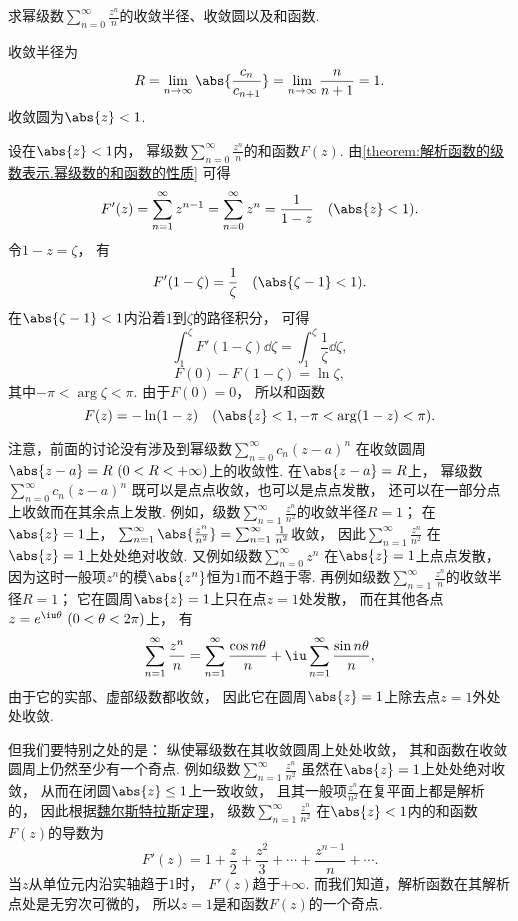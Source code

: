 \begin{example}
求幂级数\(\sum_{n=0}^\infty \frac{z^n}{n}\)的收敛半径、收敛圆以及和函数.
\begin{solution}
收敛半径为\[
	R = \lim_{n\to\infty} \abs{\frac{c_n}{c_{n+1}}}
	= \lim_{n\to\infty} \frac{n}{n+1}
	= 1.
\]
收敛圆为\(\abs{z} < 1\).

设在\(\abs{z} < 1\)内，
幂级数\(\sum_{n=0}^\infty \frac{z^n}{n}\)的和函数\(F(z)\).
由\cref{theorem:解析函数的级数表示.幂级数的和函数的性质} 可得\[
	F'(z) = \sum_{n=1}^\infty z^{n-1}
	= \sum_{n=0}^\infty z^n
	= \frac{1}{1-z}
	\quad(\abs{z} < 1).
\]
令\(1-z = \zeta\)，
有\[
	F'(1-\zeta) = \frac{1}{\zeta}
	\quad(\abs{\zeta-1}<1).
\]
在\(\abs{\zeta-1}<1\)内沿着\(1\)到\(\zeta\)的路径积分，
可得\[
	\int_1^{\zeta} F'(1-\zeta) \dd{\zeta}
	= \int_1^{\zeta} \frac{1}{\zeta} \dd{\zeta},
\]\[
	F(0) - F(1-\zeta)
	= \ln \zeta,
\]
其中\(-\pi < \arg \zeta < \pi\).
由于\(F(0) = 0\)，
所以和函数\[
	F(z) = -\ln(1-z)
	\quad(\abs{z}<1, -\pi < \arg(1-z) < \pi).
\]
\end{solution}
\end{example}
注意，前面的讨论没有涉及到幂级数\(\sum_{n=0}^\infty c_n (z-a)^n\)
在收敛圆周\(\abs{z-a}=R\ (0<R<+\infty)\)上的收敛性.
在\(\abs{z-a}=R\)上，
幂级数\(\sum_{n=0}^\infty c_n (z-a)^n\)
既可以是点点收敛，也可以是点点发散，
还可以在一部分点上收敛而在其余点上发散.
例如，级数\(\sum_{n=1}^\infty \frac{z^n}{n^2}\)的收敛半径\(R=1\)；
在\(\abs{z}=1\)上，
\(\sum_{n=1}^\infty \abs{\frac{z^n}{n^2}}
= \sum_{n=1}^\infty \frac{1}{n^2}\)收敛，
因此\(\sum_{n=1}^\infty \frac{z^n}{n^2}\)
在\(\abs{z}=1\)上处处绝对收敛.
又例如级数\(\sum_{n=0}^\infty z^n\)
在\(\abs{z}=1\)上点点发散，
因为这时一般项\(z^n\)的模\(\abs{z^n}\)恒为\(1\)而不趋于零.
再例如级数\(\sum_{n=1}^\infty \frac{z^n}{n}\)的收敛半径\(R=1\)；
它在圆周\(\abs{z}=1\)上只在点\(z=1\)处发散，
而在其他各点\(z = e^{\iu\theta}\ (0<\theta<2\pi)\)上，
有\[
	\sum_{n=1}^\infty \frac{z^n}{n}
	= \sum_{n=1}^\infty \frac{\cos n\theta}{n}
	+ \iu\sum_{n=1}^\infty \frac{\sin n\theta}{n},
\]
由于它的实部、虚部级数都收敛，
因此它在圆周\(\abs{z}=1\)上除去点\(z=1\)外处处收敛.

但我们要特别之处的是：
纵使幂级数在其收敛圆周上处处收敛，
其和函数在收敛圆周上仍然至少有一个奇点.
例如级数\(\sum_{n=1}^\infty \frac{z^n}{n^2}\)
虽然在\(\abs{z}=1\)上处处绝对收敛，
从而在闭圆\(\abs{z}\leq1\)上一致收敛，
且其一般项\(\frac{z^n}{n^2}\)在复平面上都是解析的，
因此根据\hyperref[theorem:解析函数的级数表示.魏尔斯特拉斯定理]{魏尔斯特拉斯定理}，
级数\(\sum_{n=1}^\infty \frac{z^n}{n^2}\)
在\(\abs{z}<1\)内的和函数\(F(z)\)的导数为\[
	F'(z) = 1 + \frac{z}{2} + \frac{z^2}{3} + \dotsb + \frac{z^{n-1}}{n} + \dotsb.
\]
当\(z\)从单位元内沿实轴趋于\(1\)时，
\(F'(z)\)趋于\(+\infty\).
而我们知道，解析函数在其解析点处是无穷次可微的，
所以\(z=1\)是和函数\(F(z)\)的一个奇点.
